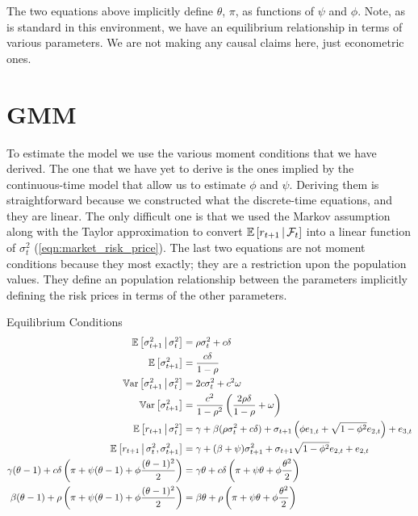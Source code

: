 \documentclass[11pt, letterpaper, twoside, final]{article}
\begin{document}
The two equations above implicitly define $\theta$, $\pi$, as functions of $\psi$ and $\phi$.
Note, as is standard in this environment, we have an equilibrium relationship in terms of various parameters.
We are not making any causal claims here, just econometric ones.


\section{GMM}\label{sec:GMM}

To estimate the model we use the various moment conditions that we have derived.
The one that we have yet to derive is the ones implied by the continuous-time model that allow us to estimate
$\phi$ and $\psi$.
Deriving them is straightforward because we constructed what the discrete-time equations, and they are linear.
The only difficult one is that we used the Markov assumption along with the Taylor approximation to convert
$\operatorname{\mathbb{E}}\left[r_{t+1} \,\middle\vert\, \mathcal{F}_t\right]$ into a linear function of $\sigma^2_t$ (\cref{eqn:market_risk_price}).
The last two equations are not moment conditions because they most exactly; they are a restriction upon the
population values.
They define an population relationship between the parameters implicitly defining the risk prices in terms of the
other parameters. 


\begin{defn}{Equilibrium Conditions}
\begin{align}
    \E\left[\sigma^2_{t+1} \mvert \sigma^2_t \right]  &= \rho \sigma^2_t  + c \delta\\
%
    \E\left[\sigma^2_{t+1}\right]  &= \frac{c \delta}{1 - \rho} \\
%
    \Var\left[\sigma^2_{t+1} \mvert \sigma^2_t \right]  &=  2 c \sigma^2_t  + c^2 \omega \\
%
    \Var\left[\sigma^2_{t+1} \right]  &=  \frac{c^2}{1 - \rho^2}  \left(\frac{2 \rho \delta}{1 - \rho}  + \omega
    \right)  \\
%
    \label{eqn:market_risk_price}
    \E\left[r_{t+1} \mvert \sigma^2_t\right] &= \gamma + \beta (\rho \sigma^2_t + c \delta) + \sigma_{t+1}
    \left(\phi e_{1,t}  + \sqrt{1 - \phi^2} e_{2,t}\right) + e_{3,t} \\
%
    \E\left[r_{t+1} \mvert \sigma^2_t, \sigma^2_{t+1}\right] &= \gamma + (\beta + \psi) \sigma^2_{t+1}  +
    \sigma_{t+1} \sqrt{1 - \phi^2}  e_{2,t} + e_{2,t} \\
%
    \gamma (\theta - 1) + c \delta \left(\pi + \psi(\theta - 1) + \phi \frac{(\theta - 1)^2}{2}\right) &= \gamma
    \theta + c \delta \left(\pi + \psi \theta + \phi \frac{\theta^2}{2} \right) \\ 
%
    \beta (\theta - 1) + \rho \left(\pi + \psi (\theta-1)  + \phi \frac{(\theta -1)^2}{2}\right)
    &= \beta \theta + \rho \left(\pi + \psi \theta  + \phi \frac{\theta^2}{2}\right) 
\end{align}
\end{defn}
\end{document}
